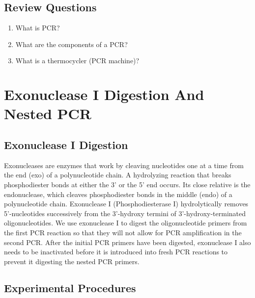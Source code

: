 \documentclass[]{book}
\providecommand{\tightlist}{%
  \setlength{\itemsep}{0pt}\setlength{\parskip}{0pt}}
\begin{document}
\hypertarget{review-questions-5}{%
\section{Review Questions}\label{review-questions-5}}

\begin{enumerate}
\def\labelenumi{\arabic{enumi}.}
\tightlist
\item
  What is PCR?
\item
  What are the components of a PCR?
\item
  What is a thermocycler (PCR machine)?
\end{enumerate}

\hypertarget{exonuclease-i-digestion-and-nested-pcr}{%
\chapter{Exonuclease I Digestion And Nested PCR}\label{exonuclease-i-digestion-and-nested-pcr}}

\hypertarget{exonuclease-i-digestion}{%
\section{Exonuclease I Digestion}\label{exonuclease-i-digestion}}

Exonucleases are enzymes that work by cleaving nucleotides one at a time from the end (exo) of a polynucleotide chain. A hydrolyzing reaction that breaks phosphodiester bonds at either the 3' or the 5' end occurs. Its close relative is the endonuclease, which cleaves phosphodiester bonds in the middle (endo) of a polynucleotide chain. Exonuclease I (Phosphodiesterase I) hydrolytically removes 5'-nucleotides successively from the 3'-hydroxy termini of 3'-hydroxy-terminated oligonucleotides. We use exonuclease I to digest the oligonucleotide primers from the first PCR reaction so that they will not allow for PCR amplification in the second PCR. After the initial PCR primers have been digested, exonuclease I also needs to be inactivated before it is introduced into fresh PCR reactions to prevent it digesting the nested PCR primers.

\hypertarget{experimental-procedures-10}{%
\section{Experimental Procedures}\label{experimental-procedures-10}}
\end{document}
